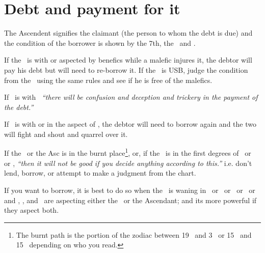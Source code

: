\section{Debt and payment for it}
The Ascendent signifies the claimant (the person to whom the debt is due) and the condition of the borrower is shown by the 7th, the \Moon\, and \Mercury.

If the \Moon\, is with or aspected by benefics while a malefic injures it, the debtor will pay his debt but will need to re-borrow it. If the \Moon\, is USB, judge the condition from the \Sun\, using the same rules and see if he is free of the malefics.

If \Mercury\, is with \Saturn\, \textsl{``there will be confusion and deception and trickery in the payment of the debt.''}

If \Mercury\, is with or in the aspect of \Mars, the debtor will need to borrow again and the two will fight and shout and quarrel over it.

If the \Moon\, or the Asc is in the burnt place\footnote{The burnt path is the portion of the zodiac between 19 \Libra\, and 3 \Scorpio\, or 15 \Libra\, and 15 \Scorpio\, depending on who you read.}, or, if the \Moon\, is in the first degrees of \Leo\, or \Gemini\, or \Capricorn, \textsl{``then it will not be good if you decide anything according to this.''} i.e. don't lend, borrow, or attempt to make a judgment from the chart.

If you want to borrow, it is best to do so when the \Moon\, is waning in \Leo\, or \Pisces\, or \Aquarius\, or \Scorpio\, or \Sagittarius\, and \Jupiter, \Venus, and \Mercury\, are aspecting either the \Moon\, or the Ascendant; and its more powerful if they aspect both.


